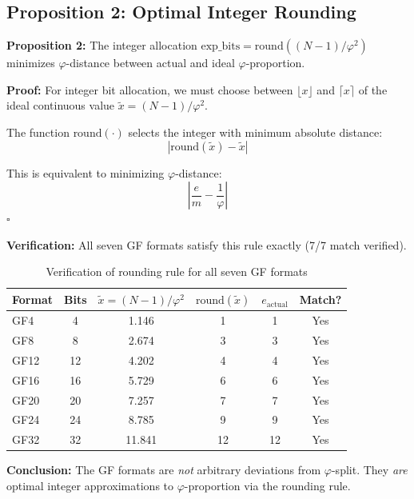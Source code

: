 \documentclass{article}
\begin{document}
\subsection{Proposition 2: Optimal Integer Rounding}

\textbf{Proposition 2:} The integer allocation $\text{exp\_bits} = \text{round}((N-1)/\varphi^2)$ minimizes $\varphi$-distance between actual and ideal $\varphi$-proportion.

\textbf{Proof:} For integer bit allocation, we must choose between $\lfloor x \rfloor$ and $\lceil x \rceil$ of the ideal continuous value $\tilde{x} = (N-1)/\varphi^2$.

The function $\text{round}(\cdot)$ selects the integer with minimum absolute distance:
\begin{equation}
|\text{round}(\tilde{x}) - \tilde{x}|
\end{equation}

This is equivalent to minimizing $\varphi$-distance:
\begin{equation}
\left|\frac{e}{m} - \frac{1}{\varphi}\right|
\end{equation}
\hfill $\square$

\textbf{Verification:} All seven GF formats satisfy this rule exactly (7/7 match verified).

\begin{table}[h]
\centering
\begin{tabular}{lccccc}
\toprule
Format & Bits & $\tilde{x} = (N-1)/\varphi^2$ & $\text{round}(\tilde{x})$ & $e_{\text{actual}}$ & Match? \\
\midrule
GF4    & 4     & 1.146 & 1 & 1 & Yes \\
GF8    & 8     & 2.674 & 3 & 3 & Yes \\
GF12   & 12    & 4.202 & 4 & 4 & Yes \\
GF16   & 16    & 5.729 & 6 & 6 & Yes \\
GF20   & 20    & 7.257 & 7 & 7 & Yes \\
GF24   & 24    & 8.785 & 9 & 9 & Yes \\
GF32   & 32    & 11.841 & 12 & 12 & Yes \\
\bottomrule
\end{tabular}
\caption{Verification of rounding rule for all seven GF formats}
\end{table}

\textbf{Conclusion:} The GF formats are \textit{not} arbitrary deviations from $\varphi$-split. They \textit{are} optimal integer approximations to $\varphi$-proportion via the rounding rule.
\end{document}
